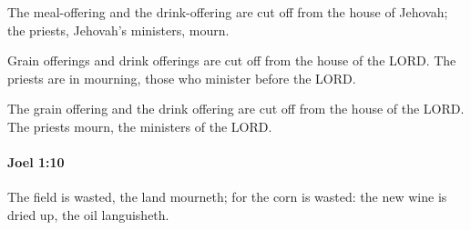 			\begin{versebox}
					\item[BHS] 
					\item[LXX] 
					\item[ASV] The meal-offering and the drink-offering are cut off from the house of Jehovah; the priests, Jehovah's ministers, mourn.
					\item[NIV] Grain offerings and drink offerings are cut off from the house of the LORD. The priests are in mourning, those who minister before the LORD.
					\item[NRSV] The grain offering and the drink offering are cut off from the house of the LORD. The priests mourn, the ministers of the LORD.
			\end{versebox}

		\paragraph{Joel 1:10} %
			\label{JOEL-1-10}

			The field is wasted, the land mourneth; for the corn is wasted: the new wine is dried up, the oil languisheth.

